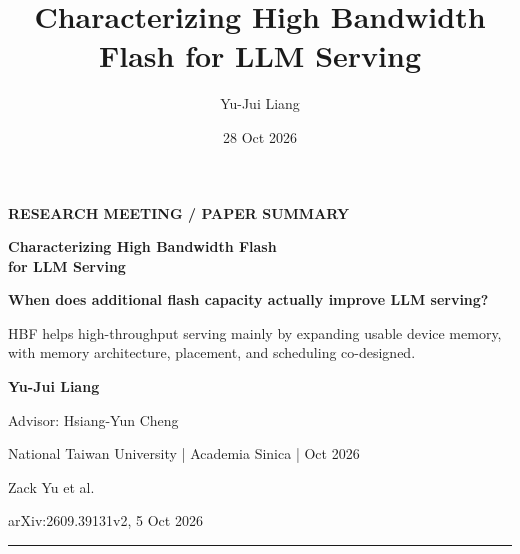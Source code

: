 \documentclass[aspectratio=169,10pt]{beamer}
\title[Characterizing HBF]{Characterizing High Bandwidth Flash for LLM Serving}
\author{Yu-Jui Liang}
\date{28 Oct 2026}
\newcommand{\smalllabel}[1]{{\scriptsize\bfseries\color{Accent}\MakeUppercase{#1}}}
\begin{document}
{
\begin{frame}[plain]
\vspace*{.45cm}
\smalllabel{Research meeting / paper summary}\par\vspace{.3cm}
{\LARGE\bfseries Characterizing High Bandwidth Flash\\[.1cm]
for LLM Serving\par}\vspace{.14cm}
{\large\bfseries When does additional flash capacity actually improve LLM serving?\par}\vspace{.28cm}
{\large\color{Accent}HBF helps high-throughput serving mainly by expanding usable device memory,\\
with memory architecture, placement, and scheduling co-designed.\par}
\vspace{.45cm}
{\bfseries Yu-Jui Liang}\par
{\small\color{Muted}Advisor: Hsiang-Yun Cheng}\par
{\small\color{Muted}National Taiwan University \quad | \quad Academia Sinica \quad |  Oct 2026}\par
\vfill
{\scriptsize\color{Muted}Zack Yu et al.\par
arXiv:2609.39131v2, 5 Oct 2026}\par\vspace{.08cm}
{\color{Accent}\rule{\textwidth}{.7pt}}
\end{frame}}
\end{document}
